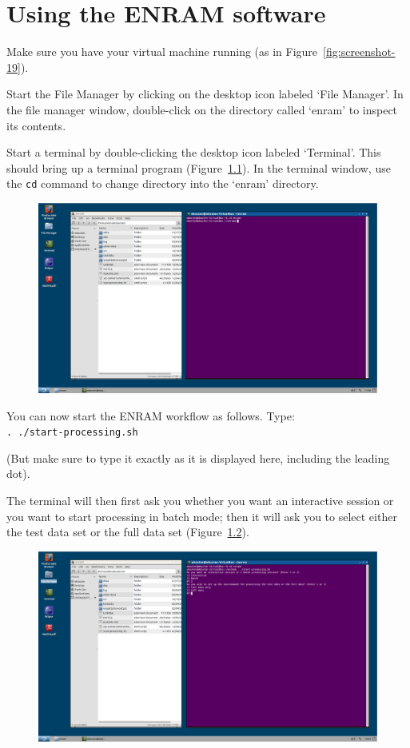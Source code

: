 \chapter{Using the ENRAM software}
\label{ch:using-the-enram-software}


Make sure you have your virtual machine running (as in Figure~\ref{fig:screenshot-19}). 

Start the File Manager by clicking on the desktop icon labeled `File Manager'. In the file manager window, double-click on the directory called `enram' to inspect its contents.

Start a terminal by double-clicking the desktop icon labeled `Terminal'. This should bring up a terminal program (Figure~\ref{fig:screenshot-24}). In the terminal window, use the \texttt{cd} command to change directory into the `enram' directory. 

\begin{figure}[ht]
  \centering
    \includegraphics[width=0.85\linewidth , keepaspectratio]{./../eps/screenshot-24.eps}
  \caption{}
  \label{fig:screenshot-24}
\end{figure}


You can now start the ENRAM workflow as follows. Type:\\
\texttt{. ./start-processing.sh}

(But make sure to type it exactly as it is displayed here, including the leading dot).

The terminal will then first ask you whether you want an interactive session or you want to start processing in batch mode; then it will ask you to select either the test data set or the full data set (Figure~\ref{fig:screenshot-25}).

\begin{figure}[ht]
  \centering
    \includegraphics[width=0.85\linewidth , keepaspectratio]{./../eps/screenshot-25.eps}
  \caption{}
  \label{fig:screenshot-25}
\end{figure}


